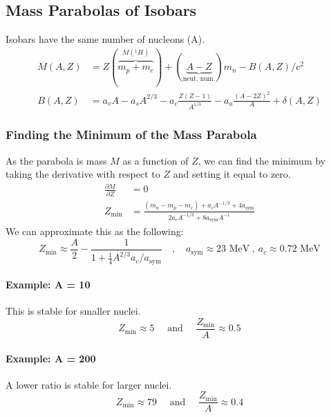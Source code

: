 \subsection{Mass Parabolas of Isobars}
Isobars have the same number of nucleons (A).
\begin{align}
M(A,Z) &= Z(\overbrace{m_p + m_e}^{M(_{}^{1}H_{})}) + (\underbrace{A-Z}_{\text{neut. num.}})m_n - B(A,Z) /c^2 \\
B(A,Z) &= a_vA - a_sA^{2 / 3} - a_c\frac{Z(Z-1)}{A^{1 / 3}} - a_a\frac{(A-2Z)^2}{A} + \delta(A,Z)
\end{align}
\subsubsection{Finding the Minimum of the Mass Parabola}
As the parabola is mass $M$ as a function of $Z$, we can find the minimum by taking the derivative with respect to $Z$ and setting it equal to zero.
\begin{align}
\frac{∂ M}{∂ Z} &= 0 \\
Z_{\text{min}} &= \frac{(m_n - m_p - m_e)+a_cA^{-1 / 3} + 4a_{\text{sym}}}{2a_{c} A^{-1 / 3} + 8a_{\text{sym}}A^{-1}}
\end{align}
We can approximate this as the following:
\begin{equation}
Z_{\text{min}} ≈ \frac{A}{2} - \frac{1}{1 + \frac{1}{4}A^{2/3}a_c / a_{\text{sym}}} \quad , \quad  a_{\text{sym}} ≈ 23 \text{ MeV} \ , \ a_c ≈ 0.72 \text{ MeV}
\end{equation}

\paragraph{Example: A = 10}
This is stable for smaller nuclei. 
\begin{equation}
Z_{\text{min}} ≈ 5 \quad \text{ and } \quad  \frac{Z_{\text{min}}}{A} ≈ 0.5
\end{equation}

\paragraph{Example: A = 200}
A lower ratio is stable for larger nuclei.
\begin{equation}
Z_{\text{min}} ≈ 79 \quad \text{ and } \quad  \frac{Z_{\text{min}}}{A} ≈ 0.4
\end{equation}


